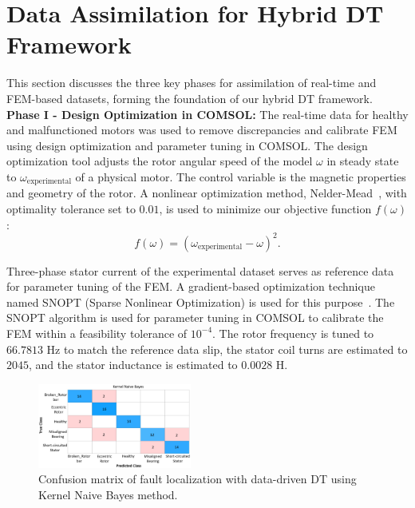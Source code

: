 \documentclass[a4paper,conference]{IEEEtran}
\begin{document}
\section{Data Assimilation for Hybrid DT Framework}\label{sec:dataAssimilation}
This section discusses the three key phases for assimilation of real-time and FEM-based datasets, forming the foundation of our hybrid DT framework. \\
\indent\textbf{Phase I - Design Optimization in COMSOL:}
The real-time data for healthy and malfunctioned motors was used to remove discrepancies and calibrate FEM using design optimization and parameter tuning in COMSOL. The design optimization tool adjusts the rotor angular speed of the model $\omega$ in steady state to $\omega_{\text{experimental}}$ of a physical motor. The control variable is the magnetic properties and geometry of the rotor. A nonlinear optimization method, Nelder-Mead~\cite{singer2009nelder}, with optimality tolerance set to $0.01$, is used to minimize our objective function $f(\omega)$:
\begin{equation}
f(\omega) = (\omega_{\text{experimental}} - \omega)^2.
\end{equation}

Three-phase stator current of the experimental dataset serves as reference data for parameter tuning of the FEM. A gradient-based optimization technique named SNOPT (Sparse Nonlinear Optimization) is used for this purpose~\cite{betts1994sparse}. The SNOPT algorithm is used for parameter tuning in COMSOL to calibrate the FEM within a feasibility tolerance of $10^{-4}$. The rotor frequency is tuned to $66.7813$ Hz to match the reference data slip, the stator coil turns are estimated to $2045$, and the stator inductance is estimated to $0.0028$ H.
 


\begin{table}[t!]
\centering
\caption{COMPARISON OF DOF BETWEEN ACTUAL FEM AND THE ROM.}
\label{tab:dof}
\end{table}



\begin{figure}[b!]
    \centering
    \includegraphics[width=0.45\textwidth]{Figs/attempt12.png}
    \caption{Confusion matrix of fault localization with data-driven DT using Kernel Naive Bayes method.}
    \label{fig:without_fusion}
\end{figure}
\end{document}
